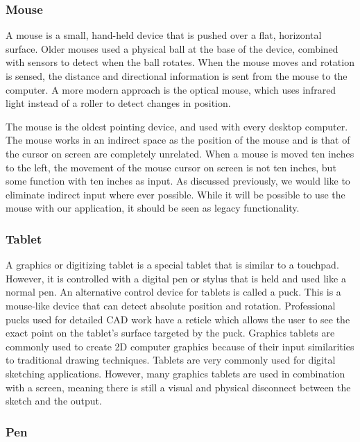  \subsubsection{Mouse}
 A mouse is a small, hand-held device that is pushed over a flat, horizontal surface.
 Older mouses used a physical ball at the base of the device, combined with sensors to detect when the ball rotates.
 When the mouse moves and rotation is sensed, the distance and directional information is sent from the mouse to the computer.
 A more modern approach is the optical mouse, which uses infrared light instead of a roller to detect changes in position.
 
 The mouse is the oldest pointing device, and used with every desktop computer.
 The mouse works in an indirect space as the position of the mouse and is that of the cursor on screen are completely unrelated.
 When a mouse is moved ten inches to the left, the movement of the mouse cursor on screen is not ten inches, but some function with ten inches as input.
 As discussed previously, we would like to eliminate indirect input where ever possible.
 While it will be possible to use the mouse with our application, it should be seen as legacy functionality.

 \subsubsection{Tablet}
 A graphics or digitizing tablet is a special tablet that is similar to a touchpad. 
 However, it is controlled with a digital pen or stylus that is held and used like a normal pen.
 An alternative control device for tablets is called a puck. 
 This is a mouse-like device that can detect absolute position and rotation.
 Professional pucks used for detailed CAD work have a reticle which allows the user to see the exact point on the tablet's surface targeted by the puck.
 Graphics tablets are commonly used to create 2D computer graphics because of their input similarities to traditional drawing techniques.
 Tablets are very commonly used for digital sketching applications.
 However, many graphics tablets are used in combination with a screen, meaning there is still a visual and physical disconnect between the sketch and the output.
 
 \subsubsection{Pen}
 
